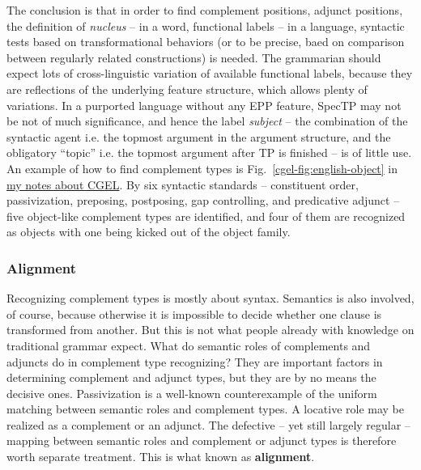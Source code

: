 \documentclass[UTF8, a4paper, oneside, scheme=plain]{ctexart}
\newcommand*{\citefig}[1]{Fig.~{#1}}
\newcommand*{\concept}[1]{\textbf{#1}}
\newcommand*{\term}[1]{\emph{#1}}
\newcommand{\cgel}{\href{../English/cambridge.pdf}{my notes about CGEL}}
\begin{document}
The conclusion is that in order to find 
complement positions, adjunct positions, the definition of \term{nucleus} 
-- in a word, functional labels -- in a language, 
syntactic tests based on transformational behaviors 
(or to be precise, baed on comparison between regularly related constructions) is needed.
The grammarian should expect lots of cross-linguistic variation of available functional labels,
because they are reflections of the underlying feature structure,
which allows plenty of variations.
In a purported language without any EPP feature, SpecTP may not be not of much significance,
and hence the label \term{subject} 
-- the combination of the syntactic agent i.e. the topmost argument in the argument structure, 
and the obligatory ``topic'' i.e. the topmost argument after TP is finished --
is of little use.
An example of how to find complement types is \citefig{\ref{cgel-fig:english-object}} in \cgel.
By six syntactic standards 
-- constituent order, passivization, preposing, postposing, gap controlling, and predicative adjunct --
five object-like complement types are identified,
and four of them are recognized as objects with one being kicked out of the object family.

\subsubsection{Alignment}\label{sec:alignment}

Recognizing complement types is mostly about syntax.
Semantics is also involved, of course, 
because otherwise it is impossible to decide whether one clause is transformed from another.
But this is not what people already with knowledge on traditional grammar expect.
What do semantic roles of complements and adjuncts 
do in complement type recognizing?
They are important factors in determining complement and adjunct types,
but they are by no means the decisive ones.
Passivization is a well-known counterexample of the uniform matching between semantic roles and complement types.
A locative role may be realized as a complement or an adjunct.
The defective -- yet still largely regular -- mapping between semantic roles and complement or adjunct types 
is therefore worth separate treatment.
This is what known as \concept{alignment}.
\end{document}
